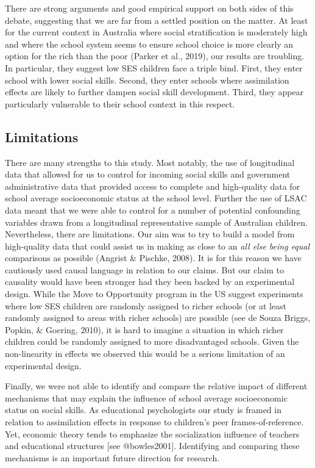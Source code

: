 \documentclass[
  english,
  man]{apa6}
\begin{document}
There are strong arguments and good empirical support on both sides of this debate, suggesting that we are far from a settled position on the matter. At least for the current context in Australia where social stratification is moderately high and where the school system seems to ensure school choice is more clearly an option for the rich than the poor (Parker et al., 2019), our results are troubling. In particular, they suggest low SES children face a triple bind. First, they enter school with lower social skills. Second, they enter schools where assimilation effects are likely to further dampen social skill development. Third, they appear particularly vulnerable to their school context in this respect.

\hypertarget{limitations}{%
\subsection{Limitations}\label{limitations}}

There are many strengths to this study. Most notably, the use of longitudinal data that allowed for us to control for incoming social skills and government administrative data that provided access to complete and high-quality data for school average socioeconomic status at the school level. Further the use of LSAC data meant that we were able to control for a number of potential confounding variables drawn from a longitudinal representative sample of Australian children. Nevertheless, there are limitations. Our aim was to try to build a model from high-quality data that could assist us in making as close to an \emph{all else being equal} comparisons as possible (Angrist \& Pischke, 2008). It is for this reason we have cautiously used causal language in relation to our claims. But our claim to causality would have been stronger had they been backed by an experimental design. While the Move to Opportunity program in the US suggest experiments where low SES children are randomly assigned to richer schools (or at least randomly assigned to areas with richer schools) are possible (see de Souza Briggs, Popkin, \& Goering, 2010), it is hard to imagine a situation in which richer children could be randomly assigned to more disadvantaged schools. Given the non-linearity in effects we observed this would be a serious limitation of an experimental design.

Finally, we were not able to identify and compare the relative impact of different mechanisms that may explain the influence of school average socioeconomic status on social skills. As educational psychologists our study is framed in relation to assimilation effects in response to children's peer frames-of-reference. Yet, economic theory tends to emphasize the socialization influence of teachers and educational structures {[}see @bowles2001{]}. Identifying and comparing these mechanisms is an important future direction for research.
\end{document}
